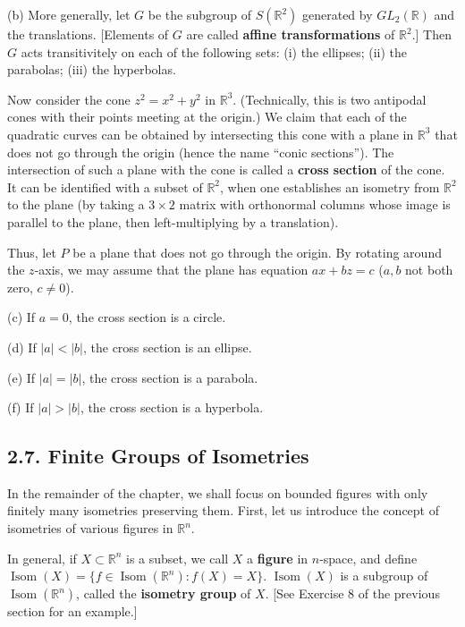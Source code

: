 \documentclass[leqno]{book}
\begin{document}
\begin{enumerate}
(b) More generally, let $G$ be the subgroup of $S(\mathbb R^2)$ generated by $GL_2(\mathbb R)$ and the translations.  [Elements of $G$ are called \textbf{affine transformations} of $\mathbb R^2$.]  Then $G$ acts transitivitely on each of the following sets: (i) the ellipses; (ii) the parabolas; (iii) the hyperbolas.

Now consider the cone $z^2=x^2+y^2$ in $\mathbb R^3$.  (Technically, this is two antipodal cones with their points meeting at the origin.)  We claim that each of the quadratic curves can be obtained by intersecting this cone with a plane in $\mathbb R^3$ that does not go through the origin (hence the name ``conic sections'').  The intersection of such a plane with the cone is called a \textbf{cross section} of the cone.  It can be identified with a subset of $\mathbb R^2$, when one establishes an isometry from $\mathbb R^2$ to the plane (by taking a $3\times 2$ matrix with orthonormal columns whose image is parallel to the plane, then left-multiplying by a translation).

Thus, let $P$ be a plane that does not go through the origin.  By rotating around the $z$-axis, we may assume that the plane has equation $ax+bz=c$ ($a,b$ not both zero, $c\ne 0$).

(c) If $a=0$, the cross section is a circle.

(d) If $|a|<|b|$, the cross section is an ellipse.

(e) If $|a|=|b|$, the cross section is a parabola.

(f) If $|a|>|b|$, the cross section is a hyperbola.
\end{enumerate}

\subsection*{2.7. Finite Groups of Isometries}
In the remainder of the chapter, we shall focus on bounded figures with only finitely many isometries preserving them.  First, let us introduce the concept of isometries of various figures in $\mathbb R^n$.

In general, if $X\subset\mathbb R^n$ is a subset, we call $X$ a \textbf{figure} in $n$-space, and define $\operatorname{Isom}(X)=\{f\in\operatorname{Isom}(\mathbb R^n):f(X)=X\}$.  $\operatorname{Isom}(X)$ is a subgroup of $\operatorname{Isom}(\mathbb R^n)$, called the \textbf{isometry group} of $X$.  [See Exercise 8 of the previous section for an example.]
\end{document}
